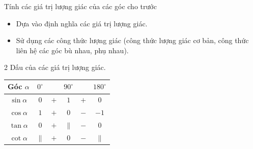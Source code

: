\begin{dang}{Tính các giá trị lượng giác của các góc cho trước}
	\begin{itemize}
		\item Dựa vào định nghĩa các giá trị lượng giác.
		\item Sử dụng các công thức lượng giác (công thức lượng giác cơ bản, công thức liên hệ các góc bù nhau, phụ nhau).
	\end{itemize}
	\begin{multicols}{2}
		Dấu của các giá trị lượng giác.
		\begin{tabular}{|c|c c c c c|}
			\hline
			Góc $\alpha$ & $0^\circ$ &     & $90^\circ$ &  & $180^\circ$   \\
			\hline
			$\sin\alpha$ & $0$ &$+$ & $1$ & $+$ & $0$\\
			\hline
			$\cos\alpha$ & $1$ &$+$ & $0$ & $-$ & $-1$\\
			\hline
			$\tan\alpha$ & $0$ & $+$ & $\parallel$ & $-$ & $0$\\
			\hline
			$\cot\alpha$ & $\parallel$ & $+$ & $0$ & $-$ & $\parallel$\\
			\hline
		\end{tabular}		
	\end{multicols}
\end{dang}
